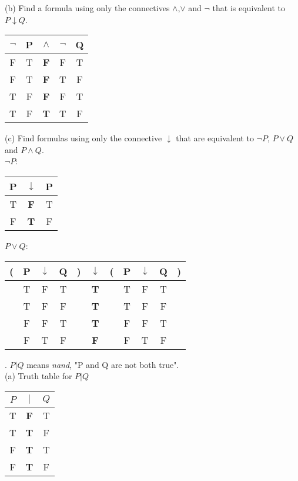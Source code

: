 \documentclass{article}
\begin{document}
\vspace{2em}
\linebreak
(b) Find a formula using only the connectives $\wedge$,$\vee$ and $\neg$ that is equivalent to $P \downarrow Q$.\\
\begin{tabular}{ccccc}
$\neg$&P&$\wedge$&$\neg$&Q\\
\hline
F&T&\textbf{F}&F&T\\
F&T&\textbf{F}&T&F\\
T&F&\textbf{F}&F&T\\
T&F&\textbf{T}&T&F\\
\end{tabular}
\vspace{2em}
\linebreak
(c) Find formulas using only the connective $\downarrow$ that are equivalent to $\neg P$, $P \vee Q$ and $P \wedge Q$.\\
$\neg P$:\\
\begin{tabular}{ccc}
P&$\downarrow$&P\\
\hline
T&\textbf{F}&T\\
F&\textbf{T}&F\\
\end{tabular}
\vspace{2em}
\linebreak
$P \vee Q$:\\
\begin{tabular}{ccccccccccc}
(&P&$\downarrow$&Q&)&$\downarrow$&(&P&$\downarrow$&Q&)\\
\hline
&T&F&T&&\textbf{T}&&T&F&T&\\
&T&F&F&&\textbf{T}&&T&F&F&\\
&F&F&T&&\textbf{T}&&F&F&T&\\
&F&T&F&&\textbf{F}&&F&T&F&\\
\end{tabular}
\vspace{2em}
. $P | Q$ means \textit{nand}, "P and Q are not both true".\\
(a) Truth table for $P | Q$\\
\begin{tabular}{ccc}
$P$&$|$&$Q$\\
\hline
T&\textbf{F}&T\\
T&\textbf{T}&F\\
F&\textbf{T}&T\\
F&\textbf{T}&F\\
\end{tabular}
\end{document}
